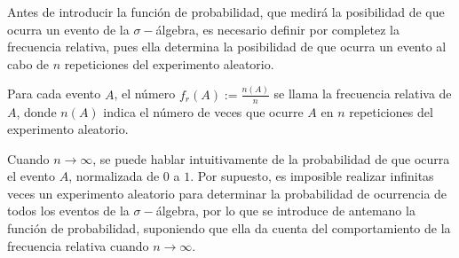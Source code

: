 	Antes de introducir la función de probabilidad, que medirá la posibilidad de que ocurra un evento de la $\sigma-$álgebra, es necesario definir por completez la frecuencia relativa, pues ella determina la posibilidad de que ocurra un evento al cabo de $n$ repeticiones del experimento aleatorio.
	\begin{defi}
		Para cada evento $A$, el número $f_r(A):=\frac{n(A)}{n}$ se llama la frecuencia relativa de $A$, donde $n(A)$ indica el número de veces que ocurre $A$ en $n$ repeticiones del experimento aleatorio.
	\end{defi}
	Cuando $n\rightarrow\infty$, se puede hablar intuitivamente de la probabilidad de que ocurra el evento $A$, normalizada de $0$ a $1$. Por supuesto, es imposible realizar infinitas veces un experimento aleatorio para determinar la probabilidad de ocurrencia de todos los eventos de la $\sigma-$álgebra, por lo que se introduce de antemano la función de probabilidad, suponiendo que ella da cuenta del comportamiento de la frecuencia relativa cuando $n\rightarrow\infty$.
	
